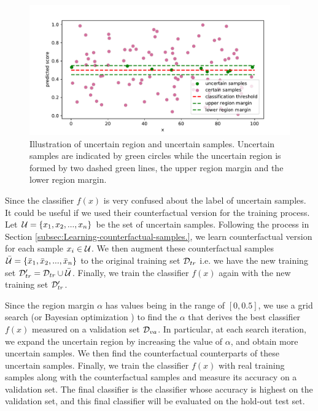 \begin{figure}
\begin{centering}
\includegraphics[scale=0.65]{figs/uncertain_samples}
\par\end{centering}
\caption{\label{fig:Illustration-of-uncertain-samples}Illustration of uncertain
region and uncertain samples. Uncertain samples are indicated by green
circles while the uncertain region is formed by two dashed green lines,
the upper region margin and the lower region margin.}
\end{figure}
Since the classifier $f(x)$ is very confused about the label of uncertain
samples. It could be useful if we used their counterfactual version
for the training process. Let ${\cal U}=\{x_{1},x_{2},...,x_{n}\}$
be the set of uncertain samples. Following the process in Section
\ref{subsec:Learning-counterfactual-samples.}, we learn counterfactual
version for each sample $x_{i}\in{\cal U}$. We then augment these
counterfactual samples $\bar{{\cal U}}=\{\bar{x}_{1},\bar{x}_{2},...,\bar{x}_{n}\}$
to the original training set ${\cal D}_{tr}$ i.e. we have the new
training set ${\cal D}'_{tr}={\cal D}_{tr}\cup\bar{{\cal U}}$. Finally,
we train the classifier $f(x)$ again with the new training set ${\cal D}'_{tr}$.

Since the region margin $\alpha$ has values being in the range of
$[0,0.5]$, we use a grid search (or Bayesian optimization \cite{nguyen2020bayesian})
to find the $\alpha$ that derives the best classifier $f(x)$ measured
on a validation set ${\cal D}_{va}$. In particular, at each search
iteration, we expand the uncertain region by increasing the value
of $\alpha$, and obtain more uncertain samples. We then find the
counterfactual counterparts of these uncertain samples. Finally, we
train the classifier $f(x)$ with real training samples along with
the counterfactual samples and measure its accuracy on a validation
set. The final classifier is the classifier whose accuracy is highest
on the validation set, and this final classifier will be evaluated
on the hold-out test set.

